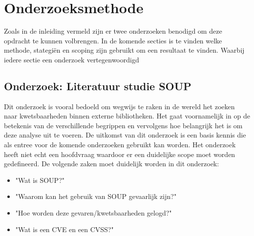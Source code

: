 
\chapter{Onderzoeksmethode}\label{ch:onderzoeksmethode} %

Zoals in de inleiding vermeld zijn er twee onderzoeken benodigd om deze opdracht te kunnen volbrengen.
In de komende secties is te vinden welke methode, stategiën en scoping zijn gebruikt om een resultaat te vinden.
Waarbij iedere sectie een onderzoek vertegenwoordigd


\section{Onderzoek: Literatuur studie SOUP}\label{sec:onderzoek:-literatuur-studie-soup}
Dit onderzoek is vooral bedoeld om wegwijs te raken in de wereld het zoeken naar kwetsbaarheden binnen externe bibliotheken.
Het gaat voornamelijk in op de betekenis van de verschillende begrippen en vervolgens hoe belangrijk het is om deze analyse uit te voeren.
De uitkomst van dit onderzoek is een basis kennis die als entree voor de komende onderzoeken gebruikt kan worden.
Het onderzoek heeft niet echt een hoofdvraag waardoor er een duidelijke scope moet worden gedefineerd.
De volgende zaken moet duidelijk worden in dit onderzoek:
\begin{itemize}
  \item "Wat is SOUP?"
  \item "Waarom kan het gebruik van SOUP gevaarlijk zijn?"
  \item "Hoe worden deze gevaren/kwetsbaarheden gelogd?"
  \item "Wat is een CVE en een CVSS?"
\end{itemize}


